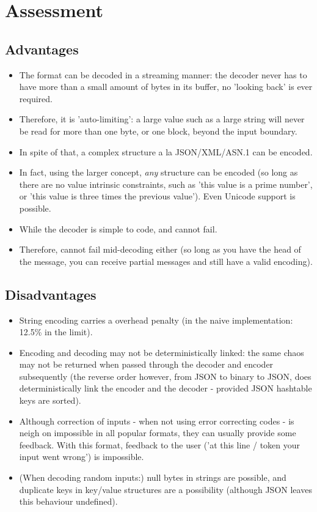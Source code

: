 \section{Assessment}

\subsection{Advantages}

\begin{itemize}
\item The format can be decoded in a streaming manner: the decoder never
      has to have
      more than a small amount of bytes in its buffer, no 'looking back' is
      ever required.
\item Therefore, it is 'auto-limiting': a large value such as a large string
      will never be read for more than one byte, or one block, beyond the
      input boundary.
\item In spite of that, a complex structure a la JSON/XML/ASN.1 can be
      encoded.
\item In fact, using the larger concept, \textit{any} structure can
      be encoded (so long as there are no value intrinsic constraints, such
      as 'this value is a prime number', or 'this value is three times the
      previous value'). Even Unicode support is possible.
\item While the decoder is simple to code, and cannot fail.
\item Therefore, cannot fail mid-decoding either (so long as you have the
      head of the message, you can receive
      partial messages and still have a valid encoding).
\end{itemize}

\subsection{Disadvantages}

\begin{itemize}
\item String encoding carries a overhead penalty
      (in the naive implementation: 12.5\% in the limit).
\item Encoding and decoding may not be deterministically linked: the same
      chaos may not be returned when passed through the decoder and encoder
      subsequently (the reverse order however, from JSON to binary to JSON,
      does deterministically link the encoder and the decoder - provided
      JSON hashtable keys are sorted).
\item Although correction of inputs - when not using error correcting codes -
      is neigh on impossible in all popular formats, they can usually
      provide some feedback. With this format, feedback to the user
      ('at this line / token your input went wrong') is impossible.
\item (When decoding random inputs:) null bytes in strings are possible,
      and duplicate
      keys in key/value structures are a possibility (although JSON
      leaves this behaviour undefined).
\end{itemize}
